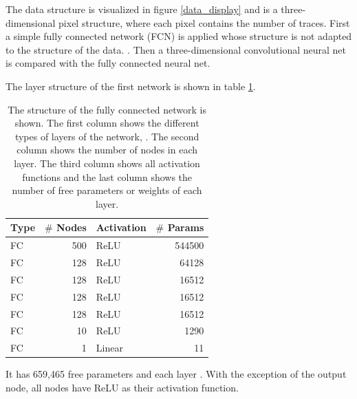 \documentclass[12pt, a4paper]{thesis}
\begin{document}
The data structure is visualized in figure \ref{data_display} and is a
three-dimensional pixel structure, where each pixel contains the
number of traces. First a simple fully connected network (FCN) is
applied whose structure is not adapted to the structure of the
data. . Then a three-dimensional
convolutional neural net is compared with the fully connected neural
net.


  
 

The layer structure of the first network is shown in table \ref{fcn_structure}.

\begin{table}[htbp]
  \centering
  \begin{tabular}{lrlr}
    Type & \(\#\) Nodes & Activation & \(\#\) Params\\
    \hline
    FC & 500 & ReLU & 544500\\
    FC & 128 & ReLU & 64128\\
    FC & 128 & ReLU & 16512\\
    FC & 128 & ReLU & 16512\\
    FC & 128 & ReLU & 16512\\
    FC & 10 & ReLU & 1290\\
    FC & 1 & Linear & 11\\
  \end{tabular}
  \caption{The structure of the fully connected network is shown. The
    first column shows the different types of layers of the network,
    . The second column shows the number of nodes in each
    layer. The third column shows all activation functions and the
    last column shows the number of free parameters or weights of each
    layer.}
  \label{fcn_structure}
\end{table}


It has 659,465 free parameters and each layer . With the exception of the output node, all nodes
have ReLU as their activation function.
\end{document}
